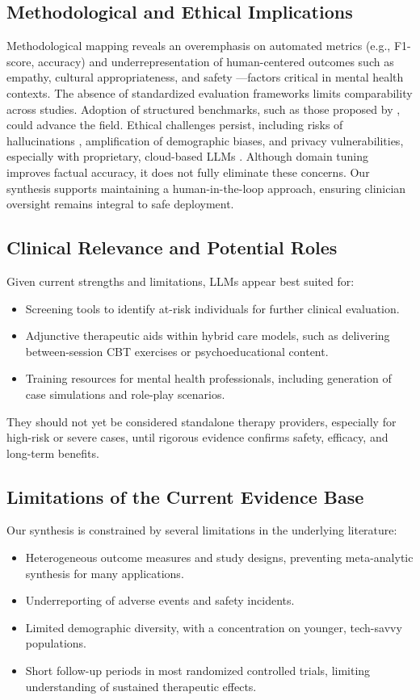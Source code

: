 \documentclass[journal]{IEEEtran}
\begin{document}
\subsection{Methodological and Ethical Implications}
Methodological mapping reveals an overemphasis on automated metrics (e.g., F1-score, accuracy) and underrepresentation of human-centered outcomes such as empathy, cultural appropriateness, and safety \citep{Hua2024b}—factors critical in mental health contexts. The absence of standardized evaluation frameworks limits comparability across studies. Adoption of structured benchmarks, such as those proposed by \citep{Jin2024}, could advance the field.
Ethical challenges persist, including risks of hallucinations \citep{Hu2025}, amplification of demographic biases, and privacy vulnerabilities, especially with proprietary, cloud-based LLMs \citep{Minerva2023}. Although domain tuning improves factual accuracy, it does not fully eliminate these concerns. Our synthesis supports maintaining a human-in-the-loop approach, ensuring clinician oversight remains integral to safe deployment.

\subsection{Clinical Relevance and Potential Roles}
Given current strengths and limitations, LLMs appear best suited for:
\begin{itemize}
\item Screening tools to identify at-risk individuals for further clinical evaluation.
\item Adjunctive therapeutic aids within hybrid care models, such as delivering between-session CBT exercises or psychoeducational content.
\item Training resources for mental health professionals, including generation of case simulations and role-play scenarios.
\end{itemize}
They should not yet be considered standalone therapy providers, especially for high-risk or severe cases, until rigorous evidence confirms safety, efficacy, and long-term benefits.

\subsection{Limitations of the Current Evidence Base}
Our synthesis is constrained by several limitations in the underlying literature:
\begin{itemize}
\item Heterogeneous outcome measures and study designs, preventing meta-analytic synthesis for many applications.
\item Underreporting of adverse events and safety incidents.
\item Limited demographic diversity, with a concentration on younger, tech-savvy populations.
\item Short follow-up periods in most randomized controlled trials, limiting understanding of sustained therapeutic effects.
\end{itemize}
\end{document}
